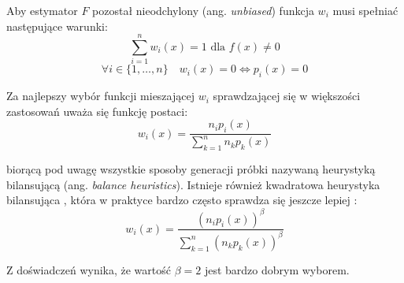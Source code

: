 \documentclass[../main.tex]{subfiles}
\begin{document}
Aby estymator $F$ pozostał nieodchylony (ang. \textit{unbiased}) funkcja $w_i$ musi spełniać następujące warunki:
\[ \sum_{i = 1}^{n} w_{i}(x) = 1 \text{ dla } f(x) \neq 0 \]
\[
  \forall i \in \{ 1, \ldots, n \} \quad
  w_{i}(x) = 0 \Leftrightarrow p_i(x) = 0
\]

Za najlepszy wybór funkcji mieszającej $w_i$ sprawdzającej się w większości zastosowań uważa się funkcję postaci:
\[
  w_{i}(x) = \frac{
    n_{i} p_{i}(x)
  }{
    \sum_{k=1}^{n} {
      n_{k} p_{k}(x)
    }
  }
\]

\noindent biorącą pod uwagę wszystkie sposoby generacji próbki nazywaną heurystyką bilansującą (ang. \textit{balance heuristics}). Istnieje również kwadratowa heurystyka bilansująca \cite{pbrt}, która w praktyce bardzo często sprawdza się jeszcze lepiej \cite{pbrt,Veach}:
\[
  w_{i}(x) = 
  \frac{
	\left( n_{i} p_{i}(x) \right)^{\beta}
  }{
	\sum_{k=1}^{n} {
		\left(n_{k} p_{k}(x)\right)^{\beta}
	}
  }
\]

Z doświadczeń \cite{Veach} wynika, że wartość $\beta = 2$ jest bardzo dobrym wyborem.
\end{document}
